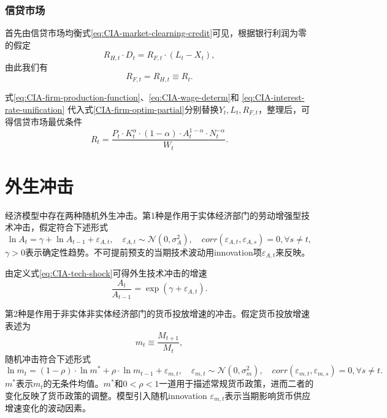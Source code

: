 \subsubsection{信贷市场}
首先由信贷市场均衡式\eqref{eq:CIA-market-clearning-credit}可见，根据银行利润为零的假定
\begin{equation*}
  R_{H,t} \cdot D_t = R_{F,t} \cdot \left(L_t - X_t \right),
\end{equation*}
由此我们有
\begin{equation}
  \label{eq:CIA-interest-rate-unification}
  R_{F,t} = R_{H,t} \equiv R_t.
\end{equation}

式\eqref{eq:CIA-firm-production-function}、\eqref{eq:CIA-wage-determ}和
\eqref{eq:CIA-interest-rate-unification} 代入式\eqref{CIA-firm-optim-partial}分别替换$Y_t, L_t, R_{F,t}$，整理后，可得信贷市场最优条件
\begin{equation}
  \label{CIA-optimal-credit-mkt}
  R_t = \frac{P_t \cdot K_t^{\alpha} \cdot (1-\alpha) \cdot A_t^{1- \alpha} \cdot N_t^{-\alpha}}{W_t}.
\end{equation}

\section{外生冲击}
\label{sec:CIA-exo-shocks}
经济模型中存在两种随机外生冲击。第1种是作用于实体经济部门的劳动增强型技术冲击，假定符合下述形式
\begin{equation}
  \label{eq:CIA-tech-shock}
  \ln A_t = \gamma + \ln A_{t-1} + \varepsilon_{A,t}, \quad \varepsilon_{A,t} \sim \mathcal{N}(0,\sigma_A^2), \quad corr(\varepsilon_{A,t}, \varepsilon_{A,s})=0, \forall s \neq t,
\end{equation}
$\gamma > 0$表示确定性趋势。不可提前预支的当期技术波动用innovation项$\varepsilon_{A,t}$来反映。

由定义式\eqref{eq:CIA-tech-shock}可得外生技术冲击的增速
\begin{equation}
  \label{eq:CIA-tech-shock-growth}
  \frac{A_t}{A_{t-1}} = \exp (\gamma + \varepsilon_{A,t}).
\end{equation}

第2种是作用于非实体非实体经济部门的货币投放增速的冲击。假定货币投放增速表述为
\begin{equation}
  \label{eq:CIA-money-injection-growth-def}
  m_t \equiv \frac{M_{t+1}}{M_t},
\end{equation}
随机冲击符合下述形式
\begin{equation}
  \label{eq:CIA-money-shock}
  \ln m_t = (1-\rho) \cdot \ln m^{*} + \rho \cdot \ln m_{t-1} + \varepsilon_{m,t}, \quad \varepsilon_{m,t} \sim \mathcal{N}(0,\sigma_m^2),  \quad corr(\varepsilon_{m,t}, \varepsilon_{m,s})=0, \forall s \neq t.
\end{equation}
$m^{*}$表示$m_t$的无条件均值。$m^{*}$和$0<\rho<1$一道用于描述常规货币政策，进而二者的变化反映了货币政策的调整。模型引入随机innovation $\varepsilon_{m,t}$表示当期影响货币供应增速变化的波动因素\citep{Sims:1982ks}。

